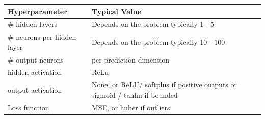 \documentclass[12pt letter]{report}
\begin{document}
\begin{longtable}[]{@{}
  >{\raggedright\arraybackslash}p{}
  >{\raggedright\arraybackslash}p{}@{}}
\toprule\noalign{}
\begin{minipage}[b]{\linewidth}\raggedright
Hyperparameter
\end{minipage} & \begin{minipage}[b]{\linewidth}\raggedright
Typical Value
\end{minipage} \\
\midrule\noalign{}
\endhead
\bottomrule\noalign{}
\endlastfoot
\# hidden layers & Depends on the problem typically 1 - 5 \\
\# neurons per hidden layer & Depends on the problem typically 10 -
100 \\
\# output neurons & 1 per prediction dimension \\
hidden activation & ReLu \\
output activation & None, or ReLU/ softplus if positive outputs or
sigmoid / tanhn if bounded \\
Loss function & MSE, or huber if outliers \\
\end{longtable}
\end{document}

